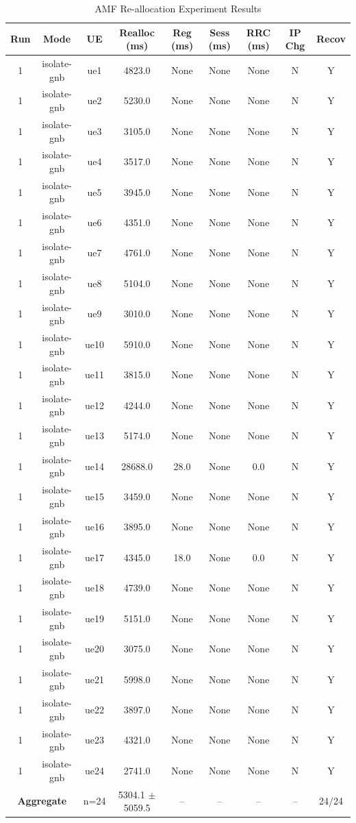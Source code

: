 \begin{table}[ht]
\centering
\begin{tabular}{|c|c|c|c|c|c|c|c|c|}
\hline
Run & Mode & UE & Realloc (ms) & Reg (ms) & Sess (ms) & RRC (ms) & IP Chg & Recov \\
\hline
1 & isolate-gnb & ue1 & 4823.0 & None & None & None & N & Y \\
1 & isolate-gnb & ue2 & 5230.0 & None & None & None & N & Y \\
1 & isolate-gnb & ue3 & 3105.0 & None & None & None & N & Y \\
1 & isolate-gnb & ue4 & 3517.0 & None & None & None & N & Y \\
1 & isolate-gnb & ue5 & 3945.0 & None & None & None & N & Y \\
1 & isolate-gnb & ue6 & 4351.0 & None & None & None & N & Y \\
1 & isolate-gnb & ue7 & 4761.0 & None & None & None & N & Y \\
1 & isolate-gnb & ue8 & 5104.0 & None & None & None & N & Y \\
1 & isolate-gnb & ue9 & 3010.0 & None & None & None & N & Y \\
1 & isolate-gnb & ue10 & 5910.0 & None & None & None & N & Y \\
1 & isolate-gnb & ue11 & 3815.0 & None & None & None & N & Y \\
1 & isolate-gnb & ue12 & 4244.0 & None & None & None & N & Y \\
1 & isolate-gnb & ue13 & 5174.0 & None & None & None & N & Y \\
1 & isolate-gnb & ue14 & 28688.0 & 28.0 & None & 0.0 & N & Y \\
1 & isolate-gnb & ue15 & 3459.0 & None & None & None & N & Y \\
1 & isolate-gnb & ue16 & 3895.0 & None & None & None & N & Y \\
1 & isolate-gnb & ue17 & 4345.0 & 18.0 & None & 0.0 & N & Y \\
1 & isolate-gnb & ue18 & 4739.0 & None & None & None & N & Y \\
1 & isolate-gnb & ue19 & 5151.0 & None & None & None & N & Y \\
1 & isolate-gnb & ue20 & 3075.0 & None & None & None & N & Y \\
1 & isolate-gnb & ue21 & 5998.0 & None & None & None & N & Y \\
1 & isolate-gnb & ue22 & 3897.0 & None & None & None & N & Y \\
1 & isolate-gnb & ue23 & 4321.0 & None & None & None & N & Y \\
1 & isolate-gnb & ue24 & 2741.0 & None & None & None & N & Y \\
\multicolumn{2}{|c|}{\textbf{Aggregate}} & n=24 & 5304.1 $\pm$ 5059.5 & -- & -- & -- & -- & 24/24 \\
\hline
\end{tabular}
\caption{AMF Re-allocation Experiment Results}
\label{tab:amf_realloc}
\end{table}

